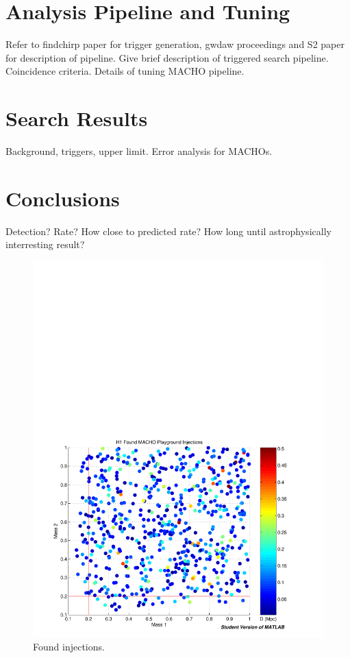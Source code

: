 
\section{Analysis Pipeline and Tuning}

Refer to findchirp paper for trigger generation, gwdaw proceedings and S2
paper for description of pipeline. Give brief description of triggered search
pipeline. Coincidence criteria. Details of tuning MACHO pipeline.

\section{Search Results}

Background, triggers, upper limit. Error analysis for MACHOs.

\section{Conclusions}

Detection? Rate? How close to predicted rate? How long until astrophysically
interresting result?

\newpage

\begin{figure}[p]
\begin{center}
\includegraphics[width=\textwidth]{analysis/figures/m1m2_found}
\end{center}
\caption{\label{f:pipeline}%
Found injections.
}
\end{figure}

